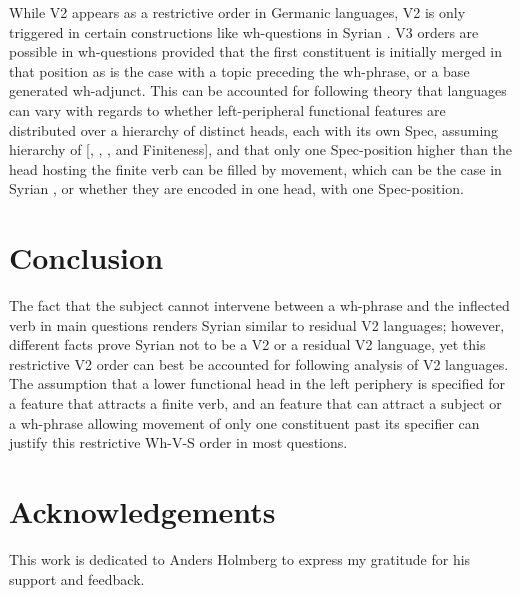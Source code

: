 \documentclass[output=paper]{LSP/langsci}
\begin{document}
While V2 appears as a restrictive order in Germanic languages, V2 is only triggered in certain constructions like wh-questions in Syrian . V3 orders are possible in wh-questions provided that the first constituent is initially merged in that position as is the case with a topic preceding the wh-phrase, or a base generated wh-adjunct. This can be accounted for following  theory that languages can vary with regards to whether left-peripheral functional features are distributed over a hierarchy of distinct heads, each with its own Spec, assuming  hierarchy of [, , , and Finiteness], and that only one Spec-position higher than the head hosting the finite verb can be filled by movement, which can be the case in Syrian , or whether they are encoded in one head, with one Spec-position.


\section{Conclusion}


The fact that the subject cannot intervene between a wh-phrase and the inflected verb in main questions renders Syrian  similar to residual V2 languages; however, different facts prove Syrian  not to be a V2 or a residual V2 language, yet this restrictive V2 order can best be accounted for following  analysis of V2 languages. The assumption that a lower functional head in the left periphery is specified for a feature that attracts a finite verb, and an  feature that can attract a subject or a wh-phrase allowing movement of only one constituent past its specifier can justify this restrictive Wh-V-S order in most questions.


\section*{Acknowledgements}
This work is dedicated to Anders Holmberg to express my gratitude for his support and feedback.


\printbibliography[heading=subbibliography,notkeyword=this]
\end{document}
